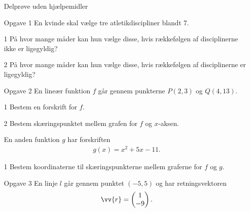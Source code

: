 \begin{center}
\LARGE
Delprøve uden hjælpemidler 
\end{center}
\begin{opgavetekst}{Opgave 1}
En kvinde skal vælge tre atletikdiscipliner blandt 7.
\end{opgavetekst}
	\begin{delopgave}{}{1}
		På hvor mange måder kan hun vælge disse, hvis rækkefølgen af disciplinerne ikke er ligegyldig?
	\end{delopgave}
	\begin{delopgave}{}{2}
		På hvor mange måder kan hun vælge disse, hvis rækkefølgen af disciplinerne er ligegyldig?
	\end{delopgave}
\begin{opgavetekst}{Opgave 2}
	En lineær funktion $f$ går gennem punkterne $P(2,3)$ og $Q(4,13)$.
\end{opgavetekst}
\begin{delopgave}{}{1}
	Bestem en forskrift for $f$. 
\end{delopgave}
\begin{delopgave}{}{2}
	Bestem skæringspunktet mellem grafen for $f$ og $x$-aksen. 
\end{delopgave}
\begin{meretekst}
	En anden funktion $g$ har forskriften 
	\begin{align*}
		g(x) = x^2+5x-11.
	\end{align*}
\end{meretekst}
\begin{delopgave}{}{1}
	Bestem koordinaterne til skæringspunkterne mellem graferne for $f$ og $g$.
\end{delopgave}
\begin{opgavetekst}{Opgave 3}
	En linje $l$ går gennem punktet $(-5,5)$ og har retningsvektoren
	\begin{align*}
		\vv{r} = 
		\begin{pmatrix}
			1 \\ -9
		\end{pmatrix}.
	\end{align*}	
\end{opgavetekst}
